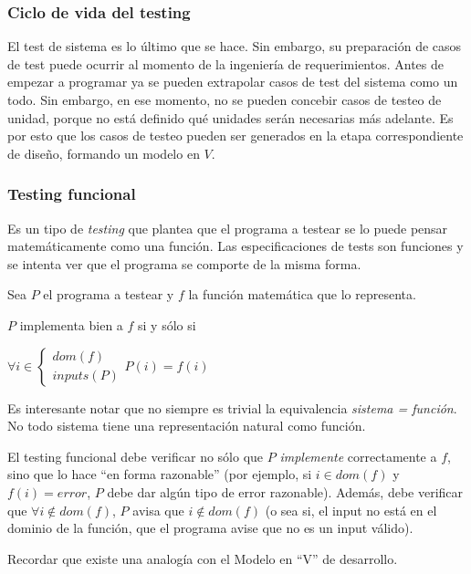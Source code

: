 \documentclass[]{article}
\begin{document}
\subsubsection{Ciclo de vida del testing}
El test de sistema es lo último que se hace. Sin embargo, su preparación de casos de test puede ocurrir al momento de la ingeniería de requerimientos. Antes de empezar a programar ya se pueden extrapolar casos de test del sistema como un todo. Sin embargo, en ese momento, no se pueden concebir casos de testeo de unidad, porque no está definido qué unidades serán necesarias más adelante. Es por esto que los casos de testeo pueden ser generados en la etapa correspondiente de diseño, formando un modelo en $V$.


\subsubsection{Testing funcional}
Es un tipo de \textit{testing} que plantea que el programa a testear se lo puede pensar matemáticamente como una función. Las especificaciones de tests son funciones y se intenta ver que el programa se comporte de la misma forma.

Sea $P$ el programa a testear y $f$ la función matemática que lo representa.


$P$ implementa bien a $f$ si y sólo si
\begin{center}
$\displaystyle \forall i \in
\begin{cases}
dom(f)\\
inputs(P)
\end{cases}
P(i)=f(i)$
\end{center}

Es interesante notar que no siempre es trivial la equivalencia \textit{sistema = función}. No todo sistema tiene una representación natural como función.
~\newline

El testing funcional debe verificar no sólo que $P$ \textit{implemente} correctamente a $f$, sino que lo hace ``en forma razonable'' (por ejemplo, si $i\in dom(f)$ y $f(i)=error$, $P$ debe dar algún tipo de error razonable). Además, debe verificar que $\forall i \not\in dom(f)$, $P$ avisa que $i\not\in dom(f)$ (o sea si, el input no está en el dominio de la función, que el programa avise que no es un input válido).

Recordar que existe una analogía con el Modelo en ``V'' de desarrollo.
\end{document}
